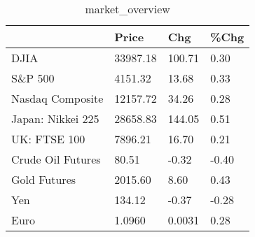 \documentclass{article}%
\begin{document}
%


\begin{table}[htbp]%
\caption{market\_overview}%
\centering%
\begin{adjustbox}{width=1\textwidth}%
\begin{tabular}{llll}
\toprule
                  &    Price &    Chg &  \%Chg \\
\midrule
             DJIA & 33987.18 & 100.71 &  0.30 \\
          S\&P 500 &  4151.32 &  13.68 &  0.33 \\
 Nasdaq Composite & 12157.72 &  34.26 &  0.28 \\
Japan: Nikkei 225 & 28658.83 & 144.05 &  0.51 \\
     UK: FTSE 100 &  7896.21 &  16.70 &  0.21 \\
Crude Oil Futures &    80.51 &  -0.32 & -0.40 \\
     Gold Futures &  2015.60 &   8.60 &  0.43 \\
              Yen &   134.12 &  -0.37 & -0.28 \\
             Euro &   1.0960 & 0.0031 &  0.28 \\
\bottomrule
\end{tabular}
%
\end{adjustbox}%
\end{table}

%
\end{document}
